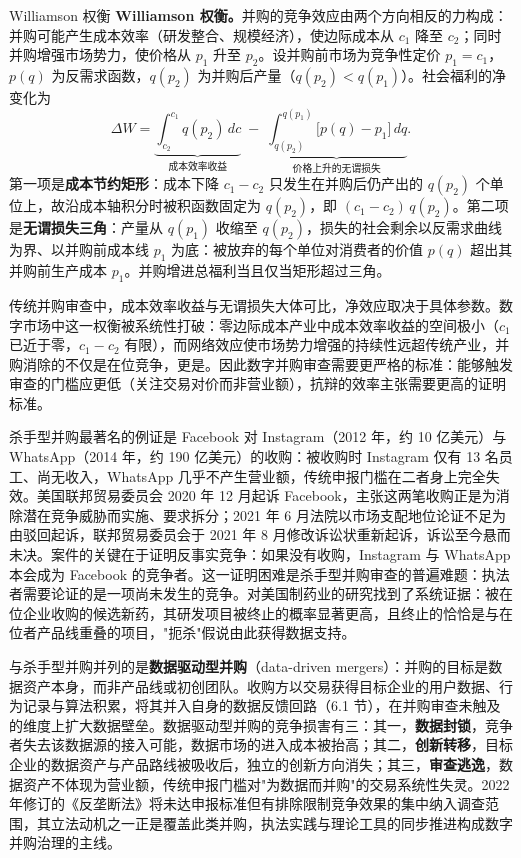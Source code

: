 \begin{derivation}{Williamson 权衡}{}
\textbf{Williamson 权衡。}并购的竞争效应由两个方向相反的力构成：并购可能产生成本效率（研发整合、规模经济），使边际成本从 $c_1$ 降至 $c_2$；同时并购增强市场势力，使价格从 $p_1$ 升至 $p_2$。设并购前市场为竞争性定价 $p_1 = c_1$，$p(q)$ 为反需求函数，$q(p_2)$ 为并购后产量（$q(p_2) < q(p_1)$）。社会福利的净变化为
\[
\Delta W = \underbrace{\int_{c_2}^{c_1} q(p_2)\, dc}_{\text{成本效率收益}} \;-\; \underbrace{\int_{q(p_2)}^{q(p_1)} \bigl[p(q) - p_1\bigr]\, dq}_{\text{价格上升的无谓损失}} .
\]
第一项是\textbf{成本节约矩形}：成本下降 $c_1 - c_2$ 只发生在并购后仍产出的 $q(p_2)$ 个单位上，故沿成本轴积分时被积函数固定为 $q(p_2)$，即 $(c_1 - c_2)\, q(p_2)$。第二项是\textbf{无谓损失三角}：产量从 $q(p_1)$ 收缩至 $q(p_2)$，损失的社会剩余以反需求曲线为界、以并购前成本线 $p_1$ 为底：被放弃的每个单位对消费者的价值 $p(q)$ 超出其并购前生产成本 $p_1$。并购增进总福利当且仅当矩形超过三角。
\end{derivation}

传统并购审查中，成本效率收益与无谓损失大体可比，净效应取决于具体参数。数字市场中这一权衡被系统性打破：零边际成本产业中成本效率收益的空间极小（$c_1$ 已近于零，$c_1 - c_2$ 有限），而网络效应使市场势力增强的持续性远超传统产业，并购消除的不仅是在位竞争，更是。因此数字并购审查需要更严格的标准：能够触发审查的门槛应更低（关注交易对价而非营业额），抗辩的效率主张需要更高的证明标准。

杀手型并购最著名的例证是 Facebook 对 Instagram（2012 年，约 10 亿美元）与 WhatsApp（2014 年，约 190 亿美元）的收购：被收购时 Instagram 仅有 13 名员工、尚无收入，WhatsApp 几乎不产生营业额，传统申报门槛在二者身上完全失效。美国联邦贸易委员会 2020 年 12 月起诉 Facebook，主张这两笔收购正是为消除潜在竞争威胁而实施、要求拆分；2021 年 6 月法院以市场支配地位论证不足为由驳回起诉，联邦贸易委员会于 2021 年 8 月修改诉讼状重新起诉，诉讼至今悬而未决。案件的关键在于证明反事实竞争：如果没有收购，Instagram 与 WhatsApp 本会成为 Facebook 的竞争者。这一证明困难是杀手型并购审查的普遍难题：执法者需要论证的是一项尚未发生的竞争。对美国制药业的研究找到了系统证据：被在位企业收购的候选新药，其研发项目被终止的概率显著更高，且终止的恰恰是与在位者产品线重叠的项目，"扼杀"假说由此获得数据支持。

与杀手型并购并列的是\textbf{数据驱动型并购}（data-driven mergers）：并购的目标是数据资产本身，而非产品线或初创团队。收购方以交易获得目标企业的用户数据、行为记录与算法积累，将其并入自身的数据反馈回路（6.1 节），在并购审查未触及的维度上扩大数据壁垒。数据驱动型并购的竞争损害有三：其一，\textbf{数据封锁}，竞争者失去该数据源的接入可能，数据市场的进入成本被抬高；其二，\textbf{创新转移}，目标企业的数据资产与产品路线被吸收后，独立的创新方向消失；其三，\textbf{审查逃逸}，数据资产不体现为营业额，传统申报门槛对"为数据而并购"的交易系统性失灵。2022 年修订的《反垄断法》将未达申报标准但有排除限制竞争效果的集中纳入调查范围，其立法动机之一正是覆盖此类并购，执法实践与理论工具的同步推进构成数字并购治理的主线。

